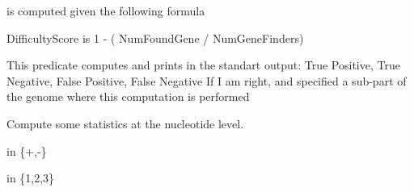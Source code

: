\begin{description}
 is computed given the following formula

\begin{code}
DifficultyScore is 1 - ( NumFoundGene / NumGeneFinders)
\end{code}

This predicate computes and prints in the standart output: True Positive,
True Negative, False Positive, False Negative
If I am right,  and  specified a sub-part of the genome where this
computation is performed

Compute some statistics at the nucleotide level.

 in \{+,-\}

 in \{1,2,3\}
\end{description}

